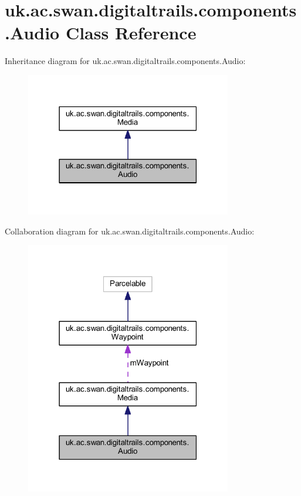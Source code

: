 \hypertarget{classuk_1_1ac_1_1swan_1_1digitaltrails_1_1components_1_1_audio}{\section{uk.\+ac.\+swan.\+digitaltrails.\+components.\+Audio Class Reference}
\label{classuk_1_1ac_1_1swan_1_1digitaltrails_1_1components_1_1_audio}
}


Inheritance diagram for uk.\+ac.\+swan.\+digitaltrails.\+components.\+Audio\+:\nopagebreak
\begin{figure}[H]
\begin{center}
\leavevmode
\includegraphics[width=255pt]{classuk_1_1ac_1_1swan_1_1digitaltrails_1_1components_1_1_audio__inherit__graph}
\end{center}
\end{figure}


Collaboration diagram for uk.\+ac.\+swan.\+digitaltrails.\+components.\+Audio\+:\nopagebreak
\begin{figure}[H]
\begin{center}
\leavevmode
\includegraphics[width=255pt]{classuk_1_1ac_1_1swan_1_1digitaltrails_1_1components_1_1_audio__coll__graph}
\end{center}
\end{figure}
